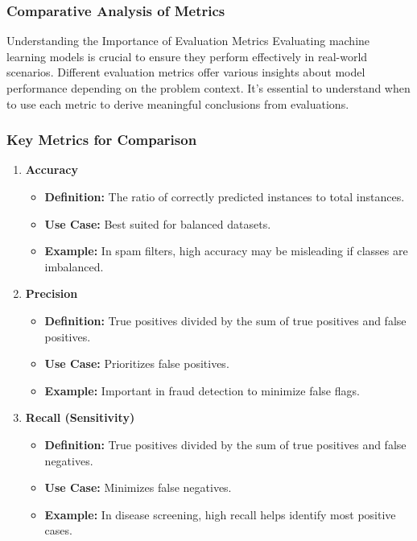 \documentclass[aspectratio=169]{beamer}
\begin{document}
\begin{frame}[fragile]
    \frametitle{Comparative Analysis of Metrics}
    \begin{block}{Understanding the Importance of Evaluation Metrics}
        Evaluating machine learning models is crucial to ensure they perform effectively in real-world scenarios. 
        Different evaluation metrics offer various insights about model performance depending on the problem context.
        It’s essential to understand when to use each metric to derive meaningful conclusions from evaluations.
    \end{block}
\end{frame}

\begin{frame}[fragile]
    \frametitle{Key Metrics for Comparison}
    \begin{enumerate}
        \item \textbf{Accuracy}
            \begin{itemize}
                \item \textbf{Definition:} The ratio of correctly predicted instances to total instances.
                \item \textbf{Use Case:} Best suited for balanced datasets.
                \item \textbf{Example:} In spam filters, high accuracy may be misleading if classes are imbalanced.
            \end{itemize}
        
        \item \textbf{Precision}
            \begin{itemize}
                \item \textbf{Definition:} True positives divided by the sum of true positives and false positives.
                \item \textbf{Use Case:} Prioritizes false positives.
                \item \textbf{Example:} Important in fraud detection to minimize false flags.
            \end{itemize}
        
        \item \textbf{Recall (Sensitivity)}
            \begin{itemize}
                \item \textbf{Definition:} True positives divided by the sum of true positives and false negatives.
                \item \textbf{Use Case:} Minimizes false negatives.
                \item \textbf{Example:} In disease screening, high recall helps identify most positive cases.
            \end{itemize}
    \end{enumerate}
\end{frame}
\end{document}
